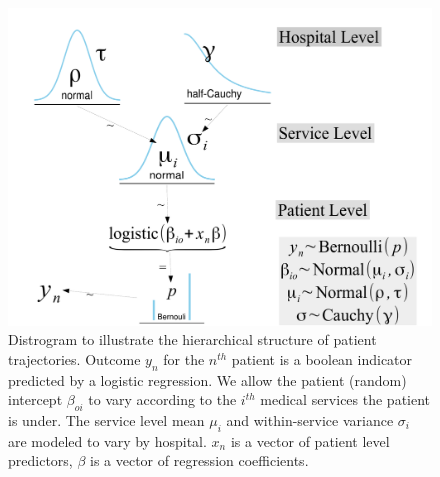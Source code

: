 \documentclass[11pt,notitlepage]{article}
\begin{document}
\begin{figure} %
 \vspace{-15pt}
 \includegraphics[scale=0.3]{Figures/Distrogram.pdf} 
  \vspace{-20pt}
 \caption{\footnotesize Distrogram to illustrate the hierarchical structure of patient trajectories. Outcome $y_n$ for the $n^{th}$ patient is a boolean indicator predicted by a logistic regression. We allow the patient (random) intercept $\beta_{oi}$ to vary according to the $i^{th}$ medical services the patient is under. The service level mean $\mu_i$ and within-service variance $\sigma_i$ are modeled to vary by hospital. $x_n$ is a vector of patient level predictors, $\beta$ is a vector of regression coefficients.}
 \vspace{-10pt}
 \label{fig:Distrogram}
\end{figure} 
\end{document}
